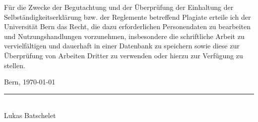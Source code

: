 \documentclass{template}
\begin{document}
Für die Zwecke der Begutachtung und der Überprüfung der Einhaltung der Selbständigkeitserklärung bzw. der Reglemente betreffend Plagiate erteile ich der Universität Bern das Recht, die dazu erforderlichen Personendaten zu bearbeiten und Nutzungshandlungen vorzunehmen, insbesondere die schriftliche Arbeit zu vervielfältigen und dauerhaft in einer Datenbank zu speichern sowie diese zur Überprüfung von Arbeiten Dritter zu verwenden oder hierzu zur Verfügung zu stellen.

\vspace{8cm}

\noindent Bern, \today

\vspace{2cm}

\noindent\rule{6cm}{0.4pt} \\
\noindent Lukas Batschelet




\clearpage
{}
   
   
\end{document}
